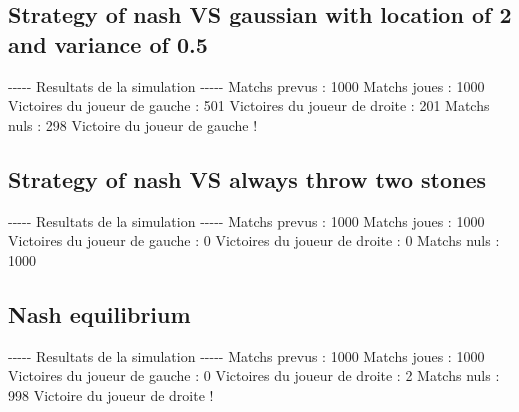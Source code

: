 \documentclass{article}%
\begin{document}
%
\subsection{Strategy of nash VS gaussian with location of 2 and variance of 0.5}%
\label{subsec:Strategy of nash VS gaussian with location of 2 and variance of 0.5}%
{-}{-}{-}{-}{-} Resultats de la simulation {-}{-}{-}{-}{-}\newline%
		\newline%
Matchs prevus : 1000\newline%
Matchs joues : 1000\newline%
\newline%
Victoires du joueur de gauche : 501\newline%
Victoires du joueur de droite : 201\newline%
Matchs nuls : 298\newline%
\newline%
Victoire du joueur de gauche !

%
\subsection{Strategy of nash VS always throw two stones}%
\label{subsec:Strategy of nash VS always throw two stones}%
{-}{-}{-}{-}{-} Resultats de la simulation {-}{-}{-}{-}{-}\newline%
		\newline%
Matchs prevus : 1000\newline%
Matchs joues : 1000\newline%
\newline%
Victoires du joueur de gauche : 0\newline%
Victoires du joueur de droite : 0\newline%
Matchs nuls : 1000\newline%
\newline%

%
\subsection{Nash equilibrium}%
\label{subsec:Nash equilibrium}%
{-}{-}{-}{-}{-} Resultats de la simulation {-}{-}{-}{-}{-}\newline%
		\newline%
Matchs prevus : 1000\newline%
Matchs joues : 1000\newline%
\newline%
Victoires du joueur de gauche : 0\newline%
Victoires du joueur de droite : 2\newline%
Matchs nuls : 998\newline%
\newline%
Victoire du joueur de droite !
\end{document}
